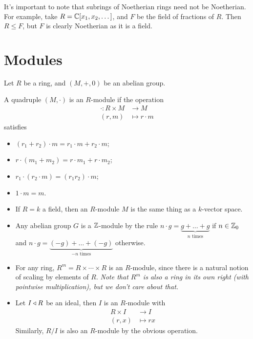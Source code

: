 \documentclass{../../template/note}
\begin{document}
    \begin{remark*}
        It's important to note that subrings of Noetherian rings need not be Noetherian. For example, take $R = \mathbb C[x_1, x_2, \dots]$, and $F$ be the field of fractions of $R$. Then $R \leq F$, but $F$ is clearly Noetherian as it is a field.
    \end{remark*}
    
    \section{Modules}

    Let $R$ be a ring, and $(M, +, 0)$ be an abelian group.

    \begin{definition}[Module]
        A quadruple $(M, \cdot)$ is an $R$-module if the operation
        \begin{align*}
            \cdot: R \times M &\to M \\
            (r, m) &\mapsto r \cdot m
        \end{align*}
        satisfies
        \begin{itemize}
            \item $(r_1+r_2) \cdot m = r_1 \cdot m + r_2 \cdot m$;
            \item $r \cdot (m_1+m_2) = r \cdot m_1 + r \cdot m_2$;
            \item $r_1 \cdot (r_2 \cdot m) = (r_1r_2) \cdot m$;
            \item $1 \cdot m = m$.
        \end{itemize}
    \end{definition}
    
    \begin{example*}
        \begin{itemize}
            \item If $R = k$ a field, then an $R$-module $M$ is the same thing as a $k$-vector space.
            \item Any abelian group $G$ is a $\mathbb Z$-module by the rule $n \cdot g = \underbrace{g+\dots+g}_{n \text{ times}}$ if $n \in \mathbb Z_0$ and $n \cdot g = \underbrace{(-g)+\dots+(-g)}_{-n \text{ times}}$ otherwise.
            \item For any ring, $R^m = R \times \cdots \times R$ is an $R$-module, since there is a natural notion of scaling by elements of $R$. \emph{Note that $R^m$ is also a ring in its own right (with pointwise multiplication), but we don't care about that.}
            \item Let $I \triangleleft R$ be an ideal, then $I$ is an $R$-module with
            \begin{align*}
                R \times I &\to I \\
                (r, x) &\mapsto rx
            \end{align*}
            Similarly, $R/I$ is also an $R$-module by the obvious operation.            
        \end{itemize}
    \end{example*}
    
\end{document}
